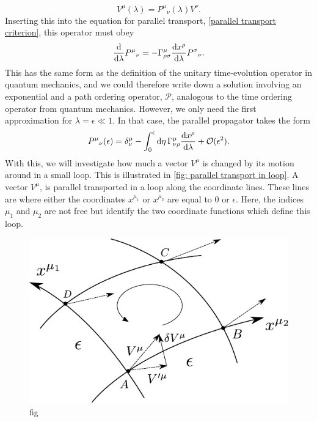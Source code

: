 %
\begin{equation}
    V^\mu(\lambda) = P^\mu{}_\nu(\lambda) V^\nu.
\end{equation}
%
Inserting this into the equation for parallel transport, \autoref{parallel transport criterion}, this operator must obey
%
\begin{equation}
    \odv{}{\lambda} P^\mu{}_\nu = - \Gamma^\mu_{\rho \sigma}  \odv{x^\rho}{\lambda}P^\sigma{}_\nu.
\end{equation}
%
This has the same form as the definition of the unitary time-evolution operator in quantum mechanics, and we could therefore write down a solution involving an exponential and a path ordering operator, $\mathcal P$, analogous to the time ordering operator from quantum mechanics.
However, we only need the first approximation for $\lambda = \epsilon \ll 1$.
In that case, the parallel propagator takes the form
%
\begin{equation}
    P^\mu{}_\nu(\epsilon) 
    = 
    \delta^\mu_\nu - \int_0^\epsilon \dd \eta \, 
    \Gamma^\mu_{\nu\rho}  \odv{x^\rho}{\lambda} + \Oh(\epsilon^2).
\end{equation}
%
With this, we will investigate how much a vector $V^\mu$ is changed by its motion around in a small loop.
This is illustrated in \autoref{fig: parallel transport in loop}.
A vector $V^\mu$, is parallel transported in a loop along the coordinate lines.
These lines are where either the coordinates $x^{\mu_1}$ or $x^{\mu_2}$ are equal to $0$ or $\epsilon$.
Here, the indices $\mu_1$ and $\mu_2$ are not free but identify the two coordinate functions which define this loop.


\begin{figure}
    \centering
    \includegraphics{figurer/parallel_transport.pdf}
    \caption{fig}
    \label{fig: parallel transport in loop}
\end{figure}



